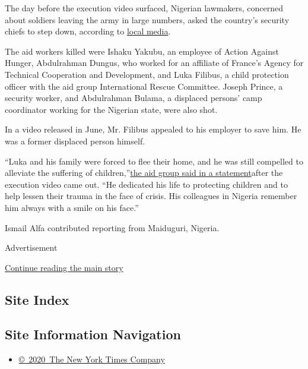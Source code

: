 The day before the execution video surfaced, Nigerian lawmakers,
concerned about soldiers leaving the army in large numbers, asked the
country's security chiefs to step down, according to
\href{https://dailypost.ng/2020/07/21/breaking-senate-asks-service-chiefs-to-step-down/?utm_source=dlvr.it\&utm_medium=facebook}{local
media}.

The aid workers killed were Ishaku Yakubu, an employee of Action Against
Hunger, Abdulrahman Dungus, who worked for an affiliate of France's
Agency for Technical Cooperation and Development, and Luka Filibus, a
child protection officer with the aid group International Rescue
Committee. Joseph Prince, a security worker, and Abdulrahman Bulama, a
displaced persons' camp coordinator working for the Nigerian state, were
also shot.

In a video released in June, Mr. Filibus appealed to his employer to
save him. He was a former displaced person himself.

``Luka and his family were forced to flee their home, and he was still
compelled to alleviate the suffering of
children,''\href{https://www.rescue.org/press-release/irc-grieves-over-loss-colleague-nigeria}{the
aid group said in a statement}after the execution video came out. ``He
dedicated his life to protecting children and to help lessen their
trauma in the face of crisis. His colleagues in Nigeria remember him
always with a smile on his face.''

Ismail Alfa contributed reporting from Maiduguri, Nigeria.

Advertisement

\protect\hyperlink{after-bottom}{Continue reading the main story}

\hypertarget{site-index}{%
\subsection{Site Index}\label{site-index}}

\hypertarget{site-information-navigation}{%
\subsection{Site Information
Navigation}\label{site-information-navigation}}

\begin{itemize}
\tightlist
\item
  \href{https://help.nytimes3xbfgragh.onion/hc/en-us/articles/115014792127-Copyright-notice}{©~2020~The
  New York Times Company}
\end{itemize}

